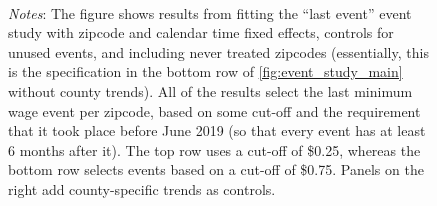 \begin{figure}[htb]
\begin{subfigure}{0.5\textwidth}
    \end{subfigure}\\
    \begin{minipage}{.95\textwidth} \footnotesize
		\vspace{2mm} 
		\textit{Notes}: The figure shows results from fitting the ``last event'' event study with zipcode and calendar time fixed effects, controls for unused events, and including never treated zipcodes (essentially, this is the specification in the bottom row of \ref{fig:event_study_main} without county trends). All of the results select the last minimum wage event per zipcode, based on some cut-off and the requirement that it took place before June 2019 (so that every event has at least 6 months after it). The top row uses a cut-off of \$0.25, whereas the bottom row selects events based on a cut-off of \$0.75. Panels on the right add county-specific trends as controls.
	\end{minipage}
\end{figure}


